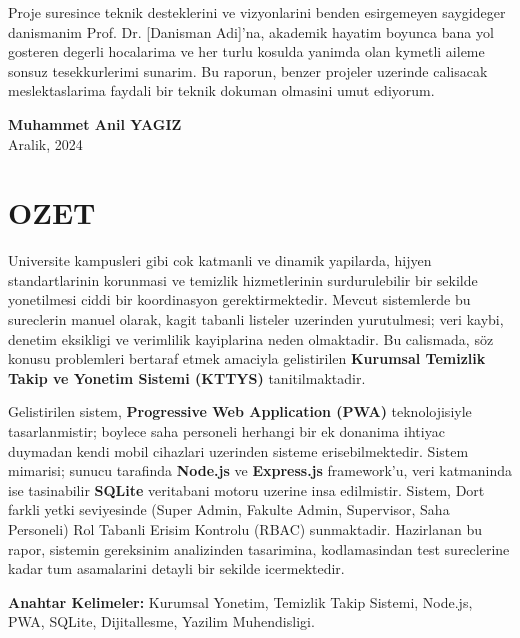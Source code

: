 \documentclass[12pt,a4paper,oneside]{report}
\begin{document}
Proje suresince teknik desteklerini ve vizyonlarini benden esirgemeyen saygideger danismanim Prof. Dr. [Danisman Adi]'na, akademik hayatim boyunca bana yol gosteren degerli hocalarima ve her turlu kosulda yanimda olan kymetli aileme sonsuz tesekkurlerimi sunarim. Bu raporun, benzer projeler uzerinde calisacak meslektaslarima faydali bir teknik dokuman olmasini umut ediyorum.

\begin{flushright}
    \textbf{Muhammet Anil YAGIZ}\\
    Aralik, 2024
\end{flushright}

\chapter*{OZET}

Universite kampusleri gibi cok katmanli ve dinamik yapilarda, hijyen standartlarinin korunmasi ve temizlik hizmetlerinin surdurulebilir bir sekilde yonetilmesi ciddi bir koordinasyon gerektirmektedir. Mevcut sistemlerde bu sureclerin manuel olarak, kagit tabanli listeler uzerinden yurutulmesi; veri kaybi, denetim eksikligi ve verimlilik kayiplarina neden olmaktadir. Bu calismada, söz konusu problemleri bertaraf etmek amaciyla gelistirilen \textbf{Kurumsal Temizlik Takip ve Yonetim Sistemi (KTTYS)} tanitilmaktadir.

Gelistirilen sistem, \textbf{Progressive Web Application (PWA)} teknolojisiyle tasarlanmistir; boylece saha personeli herhangi bir ek donanima ihtiyac duymadan kendi mobil cihazlari uzerinden sisteme erisebilmektedir. Sistem mimarisi; sunucu tarafinda \textbf{Node.js} ve \textbf{Express.js} framework'u, veri katmaninda ise tasinabilir \textbf{SQLite} veritabani motoru uzerine insa edilmistir. Sistem, Dort farkli yetki seviyesinde (Super Admin, Fakulte Admin, Supervisor, Saha Personeli) Rol Tabanli Erisim Kontrolu (RBAC) sunmaktadir. Hazirlanan bu rapor, sistemin gereksinim analizinden tasarimina, kodlamasindan test sureclerine kadar tum asamalarini detayli bir sekilde icermektedir.

\textbf{Anahtar Kelimeler:} Kurumsal Yonetim, Temizlik Takip Sistemi, Node.js, PWA, SQLite, Dijitallesme, Yazilim Muhendisligi.

\end{document}
